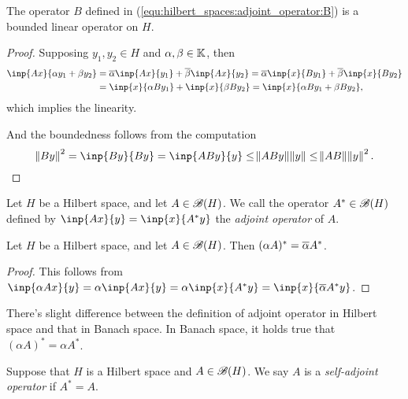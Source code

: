 \begin{prop}
The operator $B$ defined in (\ref{equ:hilbert_spaces:adjoint_operator:B}) 
is a bounded linear operator on $H$. 
\end{prop}
\begin{proof}
Supposing $y_1, y_2 \in H$ and $\alpha, \beta \in \mathbb{K}$, then 
\begin{equation*}
    \begin{aligned}
        \inp{Ax}{\alpha y_1 + \beta y_2} 
        &= \conj{\alpha} \inp{Ax}{y_1} + \conj{\beta} \inp{Ax}{y_2} 
        = \conj{\alpha} \inp{x}{B y_1} + \conj{\beta} \inp{x}{B y_2} \\ 
        &= \inp{x}{\alpha B y_1} + \inp{x}{\beta B y_2} 
        = \inp{x}{\alpha B y_1 + \beta B y_2}, 
    \end{aligned}
\end{equation*}
which implies the linearity. 

And the boundedness follows from the computation 
\begin{equation*}
    \norm{By}^2 = \inp{By}{By} = \inp{ABy}{y} 
    \le \norm{ABy} \norm{y} \le \norm{AB} \norm{y}^2. 
\end{equation*}
\end{proof}

\begin{defn}
Let $H$ be a Hilbert space, and let $A \in \mathscr{B}(H)$. 
We call the operator $A^\ast \in \mathscr{B}(H)$ defined by $\inp{Ax}{y} = 
\inp{x}{A^\ast y}$ the \emph{adjoint operator} of $A$. 
\end{defn}

\begin{prop}
Let $H$ be a Hilbert space, and let $A \in \mathscr{B}(H)$. 
Then $(\alpha A)^\ast = \overline{\alpha} A^\ast$. 
\end{prop}
\begin{proof}
This follows from $\inp{\alpha Ax}{y} = \alpha \inp{Ax}{y} = \alpha 
\inp{x}{A^\ast y} = \inp{x}{\conj{\alpha} A^\ast y}$. 
\end{proof}
\begin{rmk}
There's slight difference between the definition of adjoint operator in 
Hilbert space and that in Banach space. 
In Banach space, it holds true that $(\alpha A)^\ast = \alpha A^\ast$. 
\end{rmk}

\begin{defn}
Suppose that $H$ is a Hilbert space and $A \in \mathscr{B}(H)$. 
We say $A$ is a \emph{self-adjoint operator} if $A^\ast = A$. 
\end{defn}

